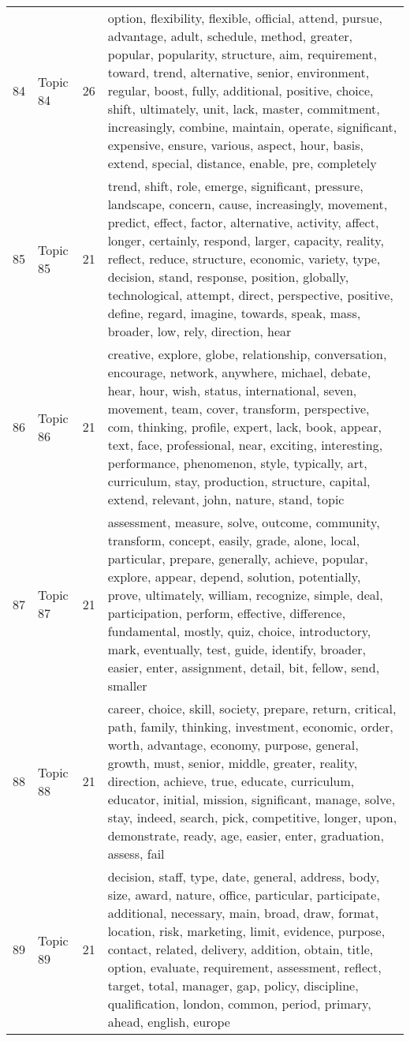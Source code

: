 \begin{table}[ht]
{\begin{tabularx}{\textwidth}{llrX}
   84 & Topic 84 & 26 & option, flexibility, flexible, official, attend, pursue, advantage, adult, schedule, method, greater, popular, popularity, structure, aim, requirement, toward, trend, alternative, senior, environment, regular, boost, fully, additional, positive, choice, shift, ultimately, unit, lack, master, commitment, increasingly, combine, maintain, operate, significant, expensive, ensure, various, aspect, hour, basis, extend, special, distance, enable, pre, completely \\ 
   85 & Topic 85 & 21 & trend, shift, role, emerge, significant, pressure, landscape, concern, cause, increasingly, movement, predict, effect, factor, alternative, activity, affect, longer, certainly, respond, larger, capacity, reality, reflect, reduce, structure, economic, variety, type, decision, stand, response, position, globally, technological, attempt, direct, perspective, positive, define, regard, imagine, towards, speak, mass, broader, low, rely, direction, hear \\ 
   86 & Topic 86 & 21 & creative, explore, globe, relationship, conversation, encourage, network, anywhere, michael, debate, hear, hour, wish, status, international, seven, movement, team, cover, transform, perspective, com, thinking, profile, expert, lack, book, appear, text, face, professional, near, exciting, interesting, performance, phenomenon, style, typically, art, curriculum, stay, production, structure, capital, extend, relevant, john, nature, stand, topic \\ 
   87 & Topic 87 & 21 & assessment, measure, solve, outcome, community, transform, concept, easily, grade, alone, local, particular, prepare, generally, achieve, popular, explore, appear, depend, solution, potentially, prove, ultimately, william, recognize, simple, deal, participation, perform, effective, difference, fundamental, mostly, quiz, choice, introductory, mark, eventually, test, guide, identify, broader, easier, enter, assignment, detail, bit, fellow, send, smaller \\ 
   88 & Topic 88 & 21 & career, choice, skill, society, prepare, return, critical, path, family, thinking, investment, economic, order, worth, advantage, economy, purpose, general, growth, must, senior, middle, greater, reality, direction, achieve, true, educate, curriculum, educator, initial, mission, significant, manage, solve, stay, indeed, search, pick, competitive, longer, upon, demonstrate, ready, age, easier, enter, graduation, assess, fail \\ 
   89 & Topic 89 & 21 & decision, staff, type, date, general, address, body, size, award, nature, office, particular, participate, additional, necessary, main, broad, draw, format, location, risk, marketing, limit, evidence, purpose, contact, related, delivery, addition, obtain, title, option, evaluate, requirement, assessment, reflect, target, total, manager, gap, policy, discipline, qualification, london, common, period, primary, ahead, english, europe \\ 

\end{tabularx}}
\end{table}
